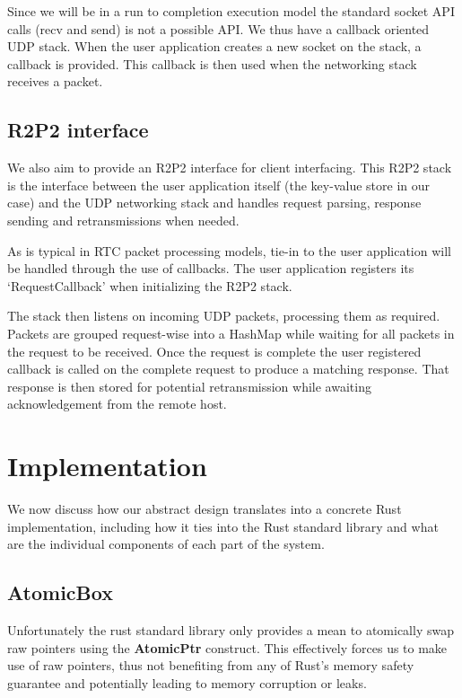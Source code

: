 \documentclass[11pt]{article}
\begin{document}
Since we will be in a run to completion execution model the standard
socket API calls (recv and send) is not a possible API. We thus have a
callback oriented UDP stack. When the user application creates a
new socket on the stack, a callback is provided. This callback is then
used when the networking stack receives a packet.

\subsection{R2P2 interface}

We also aim to provide an R2P2 interface for client interfacing. This
R2P2 stack is the interface between the user application itself (the
key-value store in our case) and the UDP networking stack and handles
request parsing, response sending and retransmissions when needed.

As is typical in RTC packet processing models, tie-in to the user
application will be handled through the use of callbacks. The user
application registers its `RequestCallback' when initializing the R2P2
stack.

The stack then listens on incoming UDP packets, processing them as
required. Packets are grouped request-wise into a HashMap while
waiting for all packets in the request to be received. Once the
request is complete the user registered callback is called on the
complete request to produce a matching response. That response is then
stored for potential retransmission while awaiting acknowledgement
from the remote host.

\section{Implementation}

We now discuss how our abstract design translates into a concrete Rust
implementation, including how it ties into the Rust standard library
and what are the individual components of each part of the system.

\subsection{AtomicBox}

Unfortunately the rust standard library only provides a mean to
atomically swap raw pointers using the \textbf{AtomicPtr}
construct. This effectively forces us to make use of raw pointers,
thus not benefiting from any of Rust's memory safety guarantee and
potentially leading to memory corruption or leaks.
\end{document}
